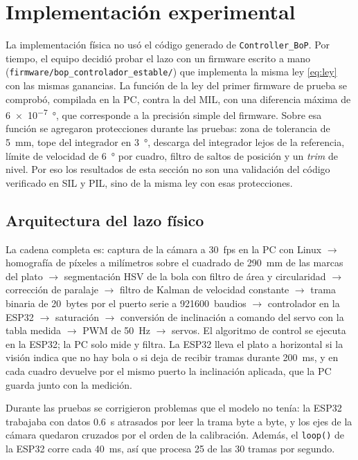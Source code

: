 \section{Implementación experimental}

La implementación física no usó el código generado de \texttt{Controller\_BoP}. Por tiempo, el
equipo decidió probar el lazo con un firmware escrito a mano
(\texttt{firmware/bop\_controlador\_estable/}) que implementa la misma ley \eqref{eq:ley} con
las mismas ganancias. La función de la ley del primer firmware de prueba se comprobó,
compilada en la PC, contra la del MIL, con una diferencia máxima de \SI{6e-7}{\degree}, que
corresponde a la precisión simple del firmware. Sobre esa función se agregaron protecciones durante las pruebas: zona de tolerancia de
\SI{5}{\milli\metre}, tope del integrador en \SI{3}{\degree}, descarga del integrador lejos de la
referencia, límite de velocidad de \SI{6}{\degree} por cuadro, filtro de saltos de posición y un
\emph{trim} de nivel. Por eso los resultados de esta sección no son una validación del código
verificado en SIL y PIL, sino de la misma ley con esas protecciones.

\subsection{Arquitectura del lazo físico}

La cadena completa es: captura de la cámara a \SI{30}{fps} en la PC con Linux $\rightarrow$
homografía de píxeles a milímetros sobre el cuadrado de \SI{290}{\milli\metre} de las marcas del
plato $\rightarrow$ segmentación HSV de la bola con filtro de área y circularidad $\rightarrow$
corrección de paralaje $\rightarrow$ filtro de Kalman de velocidad constante $\rightarrow$ trama
binaria de \SI{20}{bytes} por el puerto serie a \SI{921600}{baudios} $\rightarrow$ controlador
en la ESP32 $\rightarrow$ saturación $\rightarrow$ conversión de inclinación a comando del servo
con la tabla medida $\rightarrow$ PWM de \SI{50}{\hertz} $\rightarrow$ servos. El
algoritmo de control se ejecuta en la ESP32; la PC solo mide y filtra. La ESP32 lleva el plato a
horizontal si la visión indica que no hay bola o si deja de recibir tramas durante
\SI{200}{\milli\second}, y en cada cuadro devuelve por el mismo puerto la inclinación aplicada,
que la PC guarda junto con la medición.

Durante las pruebas se corrigieron problemas que el modelo no tenía: la ESP32 trabajaba con
datos \SI{0.6}{\second} atrasados por leer la trama byte a byte, y los ejes de la cámara quedaron
cruzados por el orden de la calibración. Además, el \texttt{loop()} de la ESP32 corre cada
\SI{40}{\milli\second}, así que procesa \num{25} de las \num{30} tramas por segundo.

